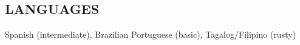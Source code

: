\documentclass[line, margin]{res}
\begin{document}
\begin{resume}
\section{LANGUAGES}
Spanish (intermediate), Brazilian Portuguese (basic), Tagalog/Filipino (rusty)






\end{resume}
\end{document}
